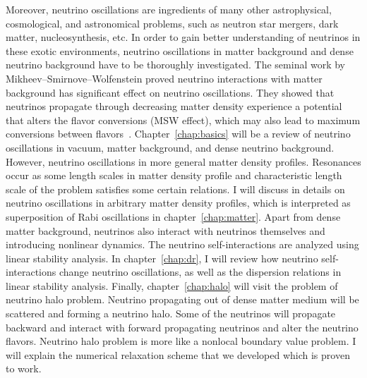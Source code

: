 Moreover, neutrino oscillations are ingredients of many other astrophysical, cosmological, and astronomical problems, such as neutron star mergers, dark matter, nucleosynthesis, etc. In order to gain better understanding of neutrinos in these exotic environments, neutrino oscillations in matter background and dense neutrino background have to be thoroughly investigated. The seminal work by Mikheev--Smirnove--Wolfenstein proved neutrino interactions with matter background has significant effect on neutrino oscillations. They showed that neutrinos propagate through decreasing matter density experience a potential that alters the flavor conversions (MSW effect), which may also lead to maximum conversions between flavors~\cite{Mikheev:1986gs,wolf78,wolfensteinprd1979}. Chapter~\ref{chap:basics} will be a review of neutrino oscillations in vacuum, matter background, and dense neutrino background. However, neutrino oscillations in more general matter density profiles. Resonances occur as some length scales in matter density profile and characteristic length scale of the problem satisfies some certain relations. I will discuss in details on neutrino oscillations in arbitrary matter density profiles, which is interpreted as superposition of Rabi oscillations in chapter~\ref{chap:matter}. Apart from dense matter background, neutrinos also interact with neutrinos themselves and introducing nonlinear dynamics. The neutrino self-interactions are analyzed using linear stability analysis. In chapter~\ref{chap:dr}, I will review how neutrino self-interactions change neutrino oscillations, as well as the dispersion relations in linear stability analysis. Finally, chapter~\ref{chap:halo} will visit the problem of neutrino halo problem. Neutrino propagating out of dense matter medium will be scattered and forming a neutrino halo. Some of the neutrinos will propagate backward and interact with forward propagating neutrinos and alter the neutrino flavors. Neutrino halo problem is more like a nonlocal boundary value problem. I will explain the numerical relaxation scheme that we developed which is proven to work.
